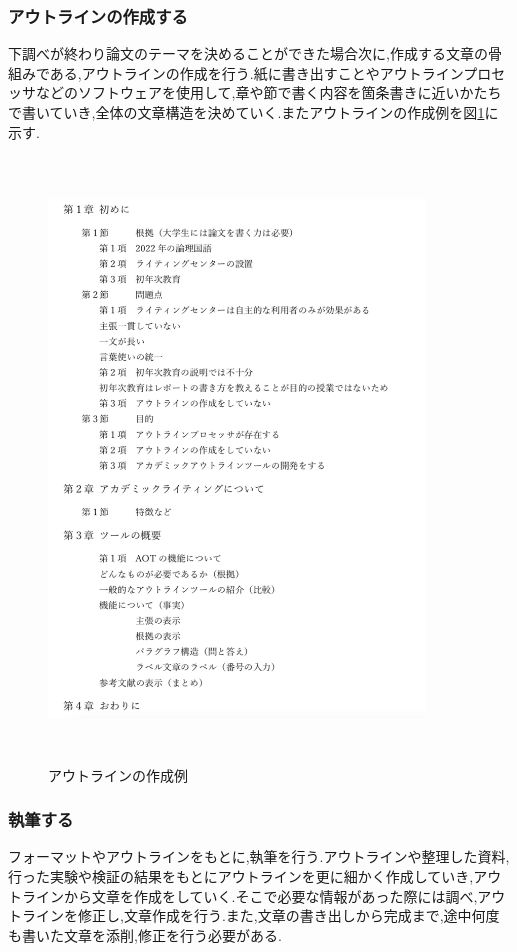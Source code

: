 \documentclass[a4j,12pt]{jarticle}
\begin{document}
\subsubsection{アウトラインの作成する}
下調べが終わり論文のテーマを決めることができた場合次に,作成する文章の骨組みである,アウトラインの作成を行う.紙に書き出すことやアウトラインプロセッサなどのソフトウェアを使用して,章や節で書く内容を箇条書きに近いかたちで書いていき,全体の文章構造を決めていく.またアウトラインの作成例を図\ref{fig:a}に示す.
\begin{figure}[h]
\begin{center}
 \includegraphics[clip,width=100mm,height=160mm]{outline2.png}
\end{center}
 \caption{アウトラインの作成例}
 \label{fig:a}
\end{figure}
\newpage
\subsubsection{執筆する}
フォーマットやアウトラインをもとに,執筆を行う.アウトラインや整理した資料,行った実験や検証の結果をもとにアウトラインを更に細かく作成していき,アウトラインから文章を作成をしていく.そこで必要な情報があった際には調べ,アウトラインを修正し,文章作成を行う.また,文章の書き出しから完成まで,途中何度も書いた文章を添削,修正を行う必要がある.
\newpage
\end{document}
